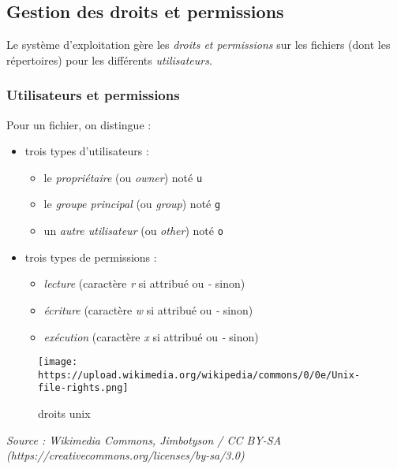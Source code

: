 \documentclass[
  11pt,
]{article}
\providecommand{\tightlist}{%
  \setlength{\itemsep}{0pt}\setlength{\parskip}{0pt}}
\newcounter{prop}
\begin{document}
\hypertarget{gestion-des-droits-et-permissions}{%
\subsection{Gestion des droits et
permissions}\label{gestion-des-droits-et-permissions}}

Le système d'exploitation gère les \emph{droits et permissions} sur les
fichiers (dont les répertoires) pour les différents \emph{utilisateurs}.

\hypertarget{utilisateurs-et-permissions}{%
\subsubsection{Utilisateurs et
permissions}\label{utilisateurs-et-permissions}}

Pour un fichier, on distingue :

\begin{itemize}
\item
  trois types d'utilisateurs :

  \begin{itemize}
  \tightlist
  \item
    le \emph{propriétaire} (ou \emph{owner}) noté \texttt{u}
  \item
    le \emph{groupe principal} (ou \emph{group}) noté \texttt{g}
  \item
    un \emph{autre utilisateur} (ou \emph{other}) noté \texttt{o}
  \end{itemize}
\item
  trois types de permissions :

  \begin{itemize}
  \tightlist
  \item
    \emph{lecture} (caractère \emph{r} si attribué ou \emph{-} sinon)
  \item
    \emph{écriture} (caractère \emph{w} si attribué ou \emph{-} sinon)
  \item
    \emph{exécution} (caractère \emph{x} si attribué ou \emph{-} sinon)
  \end{itemize}
\end{itemize}

\begin{figure}
\centering
\texttt{[image: https://upload.wikimedia.org/wikipedia/commons/0/0e/Unix-file-rights.png]}
\caption{droits unix}
\end{figure}

\emph{Source : Wikimedia Commons, Jimbotyson / CC BY-SA
(https://creativecommons.org/licenses/by-sa/3.0)}
\end{document}
